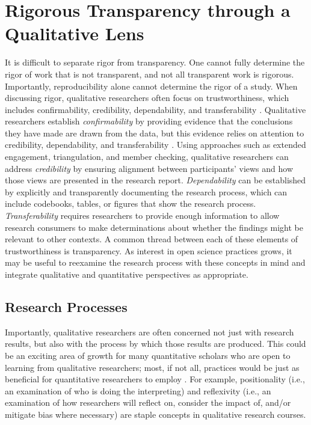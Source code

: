 \documentclass[authordate, meta, issue]{jote-new-article}
\begin{document}
\section{Rigorous Transparency through a Qualitative Lens}



It is difficult to separate rigor from transparency. One cannot fully determine the rigor of work that is not transparent, and not all transparent work is rigorous. Importantly, reproducibility alone cannot determine the rigor of a study. When discussing rigor, qualitative researchers often focus on trustworthiness, which includes confirmability, credibility, dependability, and transferability \parencites{Lincoln1986}{Stahl2020}. Qualitative researchers establish \emph{confirmability }by providing evidence that the conclusions they have made are drawn from the data, but this evidence relies on attention to credibility, dependability, and transferability \parencites{Lincoln1985}{Nowell2017}{Tobin2004}. Using approaches such as extended engagement, triangulation, and member checking, qualitative researchers can address \emph{credibility }by ensuring alignment between participants’ views and how those views are presented in the research report. \emph{Dependability }can be established by explicitly and transparently documenting the research process, which can include codebooks, tables, or figures that show the research process. \emph{Transferability }requires researchers to provide enough information to allow research consumers to make determinations about whether the findings might be relevant to other contexts. A common thread between each of these elements of trustworthiness is transparency. As interest in open science practices grows, it may be useful to reexamine the research process with these concepts in mind and integrate qualitative and quantitative perspectives as appropriate.







\subsection{Research Processes}



Importantly, qualitative researchers are often concerned not just with research results, but also with the process by which those results are produced. This could be an exciting area of growth for many quantitative scholars who are open to learning from qualitative researchers; most, if not all, practices would be just as beneficial for quantitative researchers to employ \parencites[see, for example,][]{Hope2019}. For example, positionality (i.e., an examination of who is doing the interpreting) and reflexivity (i.e., an examination of how researchers will reflect on, consider the impact of, and/or mitigate bias where necessary) are staple concepts in qualitative research courses.
\end{document}
